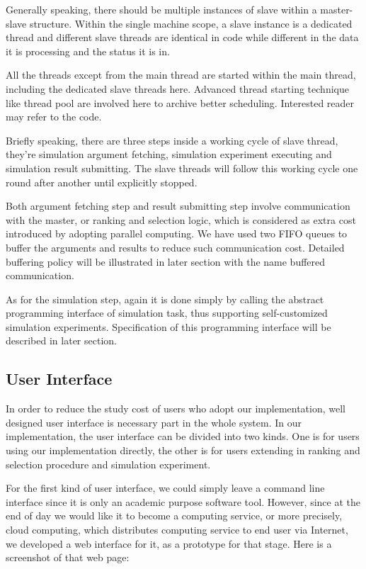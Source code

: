 \documentclass[12pt,a4]{report}
\begin{document}
Generally speaking, there should be multiple instances of slave within a master-slave structure. Within the single machine scope, a slave instance is a dedicated thread and different slave threads are identical in code while different in the data it is processing and the status it is in.

All the threads except from the main thread are started within the main thread, including the dedicated slave threads here. Advanced thread starting technique like thread pool are involved here to archive better scheduling. Interested reader may refer to the code.

Briefly speaking, there are three steps inside a working cycle of slave thread, they're simulation argument fetching, simulation experiment executing and simulation result submitting. The slave threads will follow this working cycle one round after another until explicitly stopped.

Both argument fetching step and result submitting step involve communication with the master, or ranking and selection logic, which is considered as extra cost introduced by adopting parallel computing. We have used two FIFO queues to buffer the arguments and results to reduce such communication cost. Detailed buffering policy will be illustrated in later section with the name buffered communication.

As for the simulation step, again it is done simply by calling the abstract programming interface of simulation task, thus supporting self-customized simulation experiments. Specification of this programming interface will be described in later section.

\subsection{User Interface}

In order to reduce the study cost of users who adopt our implementation, well designed user interface is necessary part in the whole system. In our implementation, the user interface can be divided into two kinds. One is for users using our implementation directly, the other is for users extending in ranking and selection procedure and simulation experiment.

For the first kind of user interface, we could simply leave a command line interface since it is only an academic purpose software tool. However, since at the end of day we would like it to become a computing service, or more precisely, cloud computing, which distributes computing service to end user via Internet, we developed a web interface for it, as a prototype for that stage. Here is a screenshot of that web page:
\end{document}
